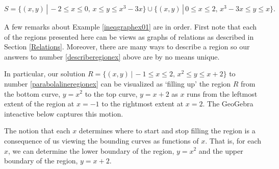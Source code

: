 \documentclass{ximera}
\begin{document}
\begin{example}
\begin{explanation}
\begin{enumerate}
\begin{enumerate}
    \[ S = \{ (x,y) \, | \, -2 \leq x \leq 0, \, x \leq y \leq x^3-3x \} \cup\{ (x,y) \, | \, 0 \leq x \leq 2, \, x^3-3x \leq y \leq x \}. \]




\end{enumerate}

\end{enumerate}
\end{explanation}
\end{example}

A few remarks about Example \ref{ineqgraphex01} are in order.  First note that each of the regions presented here can be views as graphs of relations as described in Section \ref{Relations}.  Moreover, there are many ways to describe a region so our answers to number \ref{describeregionex} above are by no means unique.

In particular, our solution $R = \{ (x,y)  \, | \,  -1 \leq x \leq 2, \,  x^2 \leq y \leq x+2 \}$ to number  \ref{parabolalineregionex} can be visualized as `filling up' the region $R$ from the bottom curve, $y = x^2$ to the top curve, $y = x+2$ as $x$ runs from the leftmost extent of the region at $x = -1$ to the rightmost extent at $x = 2$.  The GeoGebra inteactive below captures this motion.


\begin{center}
\end{center}


The notion that each $x$ determines where to start and stop filling the region is a consequence of us viewing the bounding curves as functions of $x$.  That is, for each $x$, we can determine the lower boundary of the region, $y = x^2$ and the upper boundary of the region, $y = x+2$.





\end{document}
